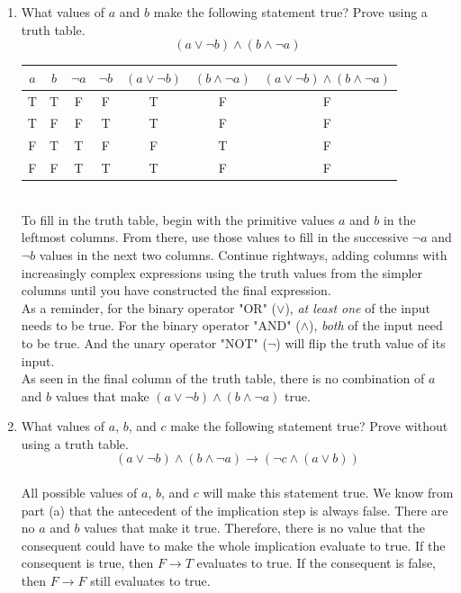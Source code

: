 \documentclass{article}
\begin{document}
\begin{enumerate}[label=\alph*.]
    \item What values of $a$ and $b$ make the following statement true? Prove using a truth table.
    $$(a \lor \neg b) \land (b \land \neg a)$$
    \begin{tabular}{|c|c|c|c|c|c|c|}
     \hline
     $a$ & $b$ & $\neg a$ & $\neg b$ & $(a\lor \neg b)$ & $(b\land\neg a)$ & $(a\lor \neg b)\land(b\land\neg a)$ \\ 
     \hline
     T & T & F & F & T & F & F \\  
     T & F & F & T & T & F & F \\
     F & T & T & F & F & T & F \\  
     F & F & T & T & T & F & F \\
     \hline
    \end{tabular}
    \\ To fill in the truth table, begin with the primitive values $a$ and $b$ in the leftmost columns. From there, use those values to fill in the successive $\neg a$ and $\neg b$ values in the next two columns. Continue rightways, adding columns with increasingly complex expressions using the truth values from the simpler columns until you have constructed the final expression.
    \\ As a reminder, for the binary operator "OR" ($\lor$), \textit{at least one} of the input needs to be true. For the binary operator "AND" ($\land$), \textit{both} of the input need to be true. And the unary operator "NOT" ($\neg$) will flip the truth value of its input.
    \\ As seen in the final column of the truth table, there is no combination of $a$ and $b$ values that make $(a\lor \neg b)\land(b\land\neg a)$ true.
    \item What values of $a$, $b$, and $c$ make the following statement true? Prove without using a truth table.
    $$(a \lor \neg b) \land (b \land \neg a)\rightarrow (\neg c\land(a\lor b))$$
    \\ All possible values of $a$, $b$, and $c$ will make this statement true. We know from part (a) that the antecedent of the implication step is always false. There are no $a$ and $b$ values that make it true. Therefore, there is no value that the consequent could have to make the whole implication evaluate to true. If the consequent is true, then $F\rightarrow T$ evaluates to true. If the consequent is false, then $F\rightarrow F$ still evaluates to true. 
\end{enumerate}
\newpage
{}
\end{document}
